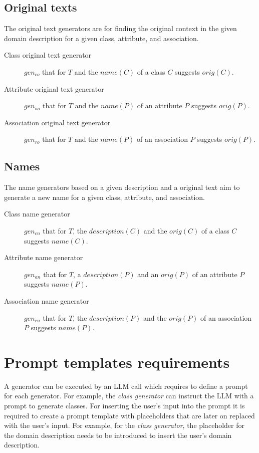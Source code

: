 \subsection{Original texts}

The original text generators are for finding the original context in the given domain description for a given class, attribute, and association.

\begin{description}
\item [Class original text generator] $gen_{co}$ that for $T$ and the $name(C)$ of a class $C$ suggests $orig(C)$.

\item [Attribute original text generator] $gen_{ao}$ that for $T$ and the $name(P)$ of an attribute $P$ suggests $orig(P)$.

\item [Association original text generator] $gen_{ro}$ that for $T$ and the $name(P)$ of an association $P$ suggests $orig(P)$.
\end{description}


\subsection{Names}

The name generators based on a given description and a original text aim to generate a new name for a given class, attribute, and association.

\begin{description}
\item [Class name generator] $gen_{cn}$ that for $T$, the $description(C)$ and the $orig(C)$ of a class $C$ suggests  $name(C)$.

\item [Attribute name generator] $gen_{an}$ that for $T$,  a $description(P)$ and an $orig(P)$ of an attribute $P$ suggests $name(P)$.

\item [Association name generator] $gen_{rn}$ that for $T$, the $description(P)$ and the $orig(P)$ of an association $P$ suggests $name(P)$.
\end{description}


\section{Prompt templates requirements}

A generator can be executed by an LLM call which requires to define a prompt for each generator. For example, the \emph{class generator} can instruct the LLM with a prompt to generate classes. For inserting the user's input into the prompt it is required to create a prompt template with placeholders that are later on replaced with the user's input. For example, for the \emph{class generator}, the placeholder for the domain description needs to be introduced to insert the user's domain description.

